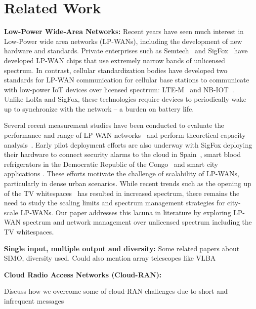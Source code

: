 \section{Related Work}
\label{sec:related-work}



\noindent \textbf{Low-Power Wide-Area Networks: } Recent years have seen much
interest in Low-Power wide area networks (LP-WANs), including the development
of new hardware and standards. Private enterprises such as
Semtech~\cite{Sornin2015, LoRaWanAlliance2015} and
SigFox~\cite{sanchez2016state} have developed LP-WAN chips that use extremely
narrow bands of unlicensed spectrum. In contrast, cellular standardization
bodies have developed two standards for LP-WAN communication for cellular base
stations to communicate with low-power IoT devices over licensed spectrum:
LTE-M~\cite{GSMAssociation2016} and NB-IOT~\cite{Ratasuk2016}. Unlike LoRa and
SigFox, these technologies require devices to periodically wake up to
synchronize with the network -- a burden on battery life.

Several recent measurement studies have been conducted to evaluate the
performance and range of LP-WAN networks~\cite{petric2016measurements,
7499263, toldov2016performance} and perform theoretical capacity
analysis~\cite{mikhaylov2016analysis}. Early pilot deployment efforts are also
underway with SigFox deploying their hardware to connect security alarms to
the cloud in Spain~\cite{sanchez2016state}, smart blood refrigerators in the
Democratic Republic of the Congo~\cite{ramachandranmupnp} and smart city
applications \cite{centenaro2015long}. These efforts motivate the challenge of
scalability of LP-WANs, particularly in dense urban scenarios. While recent
trends such as the opening up of the TV whitespaces~\cite{FCC_Whitespaces} has
resulted in increased spectrum, there remains the need to study the scaling
limits and spectrum management strategies for city-scale LP-WANs. Our paper
addresses this lacuna in literature by exploring LP-WAN spectrum and network
management over unlicensed spectrum including the TV whitespaces.
\\\vspace*{-0.1in}

\noindent \textbf{Single input, multiple output and diversity: } Some related papers about SIMO, diversity used. Could also mention array telescopes like VLBA

\noindent \textbf{Cloud Radio Access Networks (Cloud-RAN): }

{\color{blue} Discuss how we overcome some of cloud-RAN challenges due to short and infrequent messages}